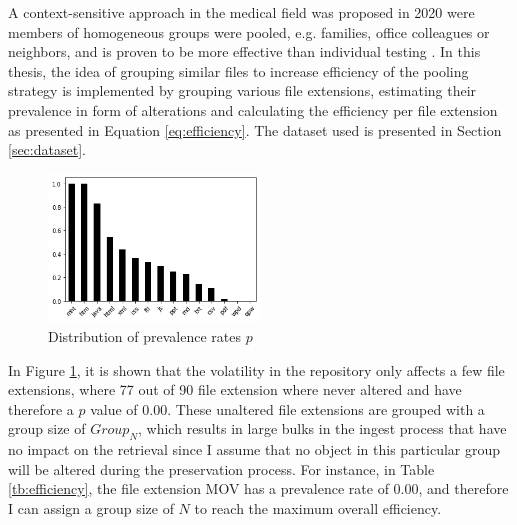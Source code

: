 A context-sensitive approach in the medical field was proposed in 2020 were members of homogeneous groups were pooled, e.g. families, office colleagues or neighbors, and is proven to be more effective than individual testing \cite[4]{deckert2020simulation}. In this thesis, the idea of grouping similar files to increase efficiency of the pooling strategy is implemented by grouping various file extensions, estimating their prevalence in form of alterations and calculating the efficiency per file extension as presented in Equation \ref{eq:efficiency}. The dataset used is presented in Section \ref{sec:dataset}.
\begin{figure}[h]%
    \centering
    \caption{Distribution of prevalence rates $p$}\label{fig:p-distribution}
    \includegraphics[width=0.5\textwidth]{graphics/p-distribution.png}
\end{figure}
In Figure \ref{fig:p-distribution}, it is shown that the volatility in the repository only affects a few file extensions, where 77 out of 90 file extension where never altered and have therefore a $p$ value of 0.00. These unaltered file extensions are grouped with a group size of $Group_N$, which results in large bulks in the ingest process that have no impact on the retrieval since I assume that no object in this particular group will be altered during the preservation process. For instance, in Table \ref{tb:efficiency}, the file extension MOV has a prevalence rate of $0.00$, and therefore I can assign a group size of $N$ to reach the maximum overall efficiency.
